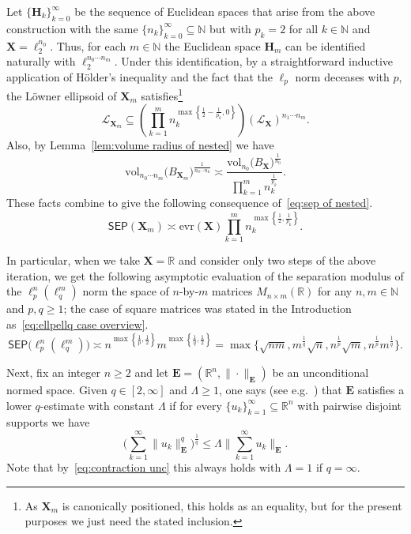 \documentclass[11pt,reqno]{amsart}
\renewcommand{\le}{\leqslant}
\renewcommand{\ge}{\geqslant}
\newcommand{\evr}{\mathrm{evr}}
\newcommand{\X}{\mathbf X}
\newcommand{\R}{\mathbb R}
\theoremstyle{remark}
\renewcommand{\subset}{\subseteq}
\newcommand{\N}{\mathbb N}
\newcommand{\vol}{\mathrm{vol}}
\renewcommand{\1}{\mathbf 1}
\newcommand{\sep}{\mathsf{SEP}}
\newcommand{\bfE}{\mathbf{E}}
\newcommand{\bfH}{\mathbf{H}}
\begin{document}
Let $\{\bfH_k\}_{k=0}^\infty$ be the sequence of Euclidean spaces that arise from the above construction with the same $\{n_k\}_{k=0}^\infty\subset  \N$ but with $p_k=2$ for all $k\in \N$ and $\X=\ell_2^{n_0}$. Thus, for each $m\in \N$ the Euclidean space $\bfH_m$ can be identified naturally with $\ell_2^{n_0\cdots n_m}$. Under this identification, by a straightforward inductive application of   H\"older's inequality and the fact that the $\ell_p$ norm deceases with $p$, the L\"owner ellipsoid of $\X_m$ satisfies\footnote{As $\X_m$ is canonically positioned, this holds as an equality, but for the present purposes we just need the stated inclusion.}
$$
\mathscr{L}_{\X_m}\subset  \left(\prod_{k=1}^m n_k^{\max\left\{\frac12-\frac{1}{p_k},0\right\}}\right)(\mathscr{L}_\X)^{n_1\cdots n_m}.
$$
 Also, by Lemma~\ref{lem:volume radius of nested} we have
$$
\vol_{n_0\cdots n_m}\big(B_{\X_m}\big)^{\frac{1}{n_0\cdots n_k}}\asymp \frac{\vol_{n_0}\big(B_\X\big)^{\frac{1}{n_0}}}{\prod_{k=1}^m n_k^{\frac{1}{p_k}}}.
$$
These facts combine to give the following consequence of~\eqref{eq:sep of nested}.
$$
\sep(\X_m)\asymp \evr(\X) \prod_{k=1}^m n_k^{\max\left\{\frac12,\frac{1}{p_k}\right\}}.
$$

In particular, when we take $\X=\R$  and consider only two steps of the above iteration, we get the following asymptotic evaluation of the separation modulus of the $\ell_p^n(\ell_q^m)$ norm the space of  $n$-by-$m$ matrices $M_{n\times m}(\R)$ for any $n,m\in \N$ and $p,q\ge 1$; the case of square matrices was stated in the Introduction as~\eqref{eq:ellpellq case overview}.
\begin{equation}\label{eq:sep  lpnlqm}
\sep\big(\ell_p^n(\ell_q^m)\big) \asymp n^{\max\left\{\frac1{p},\frac{1}{2}\right\}}m^{\max\left\{\frac1{q},\frac{1}{2}\right\}}=\max\Big\{\sqrt{nm},m^{\frac{1}{q}}\sqrt{n},
n^{\frac{1}{p}}\sqrt{m},n^{\frac{1}{p}}m^{\frac{1}{q}}\Big\}.
\end{equation}









Next, fix an integer $n\ge 2$ and let  $\bfE=(\R^n,\|\cdot\|_{\bfE})$ be an unconditional normed space. Given $q\in [2,\infty]$ and $\Lambda\ge 1$, one says (see e.g.~\cite[Definition1.f.4]{LT79}) that $\bfE$ satisfies a lower $q$-estimate with constant $\Lambda$ if for every $\{u_k\}_{k=1}^\infty\subset \R^n$ with pairwise disjoint supports we have
\begin{equation}\label{eq:def lower q}
\bigg(\sum_{k=1}^\infty \|u_k\|_\bfE^q\bigg)^{\frac{1}{q}}\le \Lambda \Big\|\sum_{k=1}^\infty u_k\Big\|_\bfE.
\end{equation}
Note that by~\eqref{eq:contraction unc} this always holds with $\Lambda=1$ if $q=\infty$.
\end{document}

